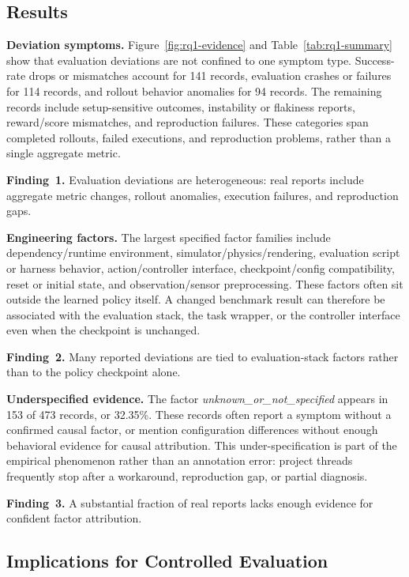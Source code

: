 \subsection{Results}

\noindent\textbf{Deviation symptoms.}
Figure~\ref{fig:rq1-evidence} and Table~\ref{tab:rq1-summary} show that evaluation deviations are not confined to one symptom type. Success-rate drops or mismatches account for 141 records, evaluation crashes or failures for 114 records, and rollout behavior anomalies for 94 records. The remaining records include setup-sensitive outcomes, instability or flakiness reports, reward/score mismatches, and reproduction failures. These categories span completed rollouts, failed executions, and reproduction problems, rather than a single aggregate metric.

\noindent\textbf{Finding~1.} Evaluation deviations are heterogeneous: real reports include aggregate metric changes, rollout anomalies, execution failures, and reproduction gaps.

\noindent\textbf{Engineering factors.}
The largest specified factor families include dependency/runtime environment, simulator/physics/rendering, evaluation script or harness behavior, action/controller interface, checkpoint/config compatibility, reset or initial state, and observation/sensor preprocessing. These factors often sit outside the learned policy itself. A changed benchmark result can therefore be associated with the evaluation stack, the task wrapper, or the controller interface even when the checkpoint is unchanged.

\noindent\textbf{Finding~2.} Many reported deviations are tied to evaluation-stack factors rather than to the policy checkpoint alone.

\noindent\textbf{Underspecified evidence.}
The factor \mbox{\emph{unknown\_or\_not\_specified}} appears in 153 of 473 records, or 32.35\%. These records often report a symptom without a confirmed causal factor, or mention configuration differences without enough behavioral evidence for causal attribution. This under-specification is part of the empirical phenomenon rather than an annotation error: project threads frequently stop after a workaround, reproduction gap, or partial diagnosis.

\noindent\textbf{Finding~3.} A substantial fraction of real reports lacks enough evidence for confident factor attribution.

\subsection{Implications for Controlled Evaluation}

